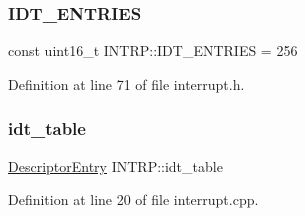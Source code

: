 \subsubsection{\texorpdfstring{I\+D\+T\+\_\+\+E\+N\+T\+R\+I\+ES}{IDT\_ENTRIES}}
{\footnotesize\ttfamily const uint16\+\_\+t I\+N\+T\+R\+P\+::\+I\+D\+T\+\_\+\+E\+N\+T\+R\+I\+ES = 256}



Definition at line 71 of file interrupt.\+h.

\mbox{\label{namespace_i_n_t_r_p_a8e4e29dae90a4087ed1ac8cf845218c4}} 
\subsubsection{\texorpdfstring{idt\+\_\+table}{idt\_table}}
{\footnotesize\ttfamily \hyperlink{union_i_n_t_r_p_1_1_descriptor_entry}{Descriptor\+Entry} I\+N\+T\+R\+P\+::idt\+\_\+table}



Definition at line 20 of file interrupt.\+cpp.

